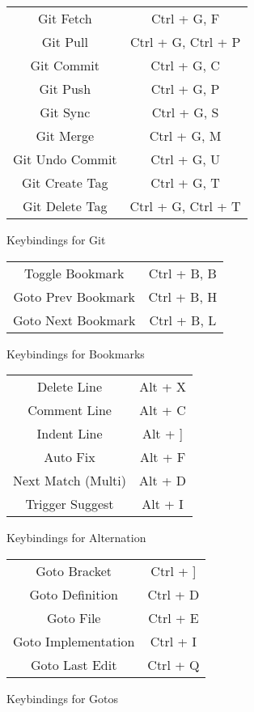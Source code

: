 \documentclass[10pt]{article}
\begin{document}
	\begin{figure}[H]
		\centering
		\begin{tabular}{@{}c c@{}}
			\midrule

			Git Fetch & Ctrl + G, F \\
			Git Pull & Ctrl + G, Ctrl + P \\
			Git Commit & Ctrl + G, C \\
			Git Push & Ctrl + G, P \\
			Git Sync & Ctrl + G, S \\
			Git Merge & Ctrl + G, M \\
			Git Undo Commit & Ctrl + G, U \\
			Git Create Tag & Ctrl + G, T \\
			Git Delete Tag & Ctrl + G, Ctrl + T \\

			\bottomrule
		\end{tabular}
		\caption{Keybindings for Git}
	\end{figure}

	\begin{figure}[H]
		\centering
		\begin{tabular}{@{}c c@{}}
			\midrule

			Toggle Bookmark & Ctrl + B, B \\
			Goto Prev Bookmark & Ctrl + B, H \\
			Goto Next Bookmark & Ctrl + B, L \\

			\bottomrule
		\end{tabular}
		\caption{Keybindings for Bookmarks}
	\end{figure}


	\begin{figure}[H]
		\centering
		\begin{tabular}{@{}c c@{}}
			\midrule

			Delete Line & Alt + X \\
			Comment Line & Alt + C \\
			Indent Line & Alt + ] \\
			Auto Fix & Alt + F \\
			Next Match (Multi) & Alt + D \\
			Trigger Suggest & Alt + I \\

			\bottomrule
		\end{tabular}
		\caption{Keybindings for Alternation}
	\end{figure}

	\begin{figure}[H]
		\centering
		\begin{tabular}{@{}c c@{}}
			\midrule

			Goto Bracket & Ctrl + ] \\
			Goto Definition & Ctrl + D \\
			Goto File & Ctrl + E \\
			Goto Implementation & Ctrl + I \\
			Goto Last Edit & Ctrl + Q \\

			\bottomrule
		\end{tabular}
		\caption{Keybindings for Gotos}
	\end{figure}
\end{document}
